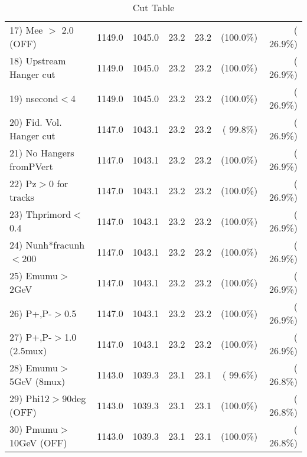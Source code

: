 \begin{table}[h!]
\begin{tabular}{||l||r|r|r|r|r|r||}
 17) Mee $>$ 2.0  (OFF)   &       1149.0 &       1045.0 &         23.2 &         23.2 & (100.0\%) & ( 26.9\%) \\
 18) Upstream Hanger cut  &       1149.0 &       1045.0 &         23.2 &         23.2 & (100.0\%) & ( 26.9\%) \\
 19) nsecond$<$4          &       1149.0 &       1045.0 &         23.2 &         23.2 & (100.0\%) & ( 26.9\%) \\
 20) Fid. Vol. Hanger cut &       1147.0 &       1043.1 &         23.2 &         23.2 & ( 99.8\%) & ( 26.9\%) \\
 21) No Hangers fromPVert &       1147.0 &       1043.1 &         23.2 &         23.2 & (100.0\%) & ( 26.9\%) \\
 22) Pz$>$0 for tracks    &       1147.0 &       1043.1 &         23.2 &         23.2 & (100.0\%) & ( 26.9\%) \\
 23) Thprimord$<$0.4      &       1147.0 &       1043.1 &         23.2 &         23.2 & (100.0\%) & ( 26.9\%) \\
 24) Nunh*fracunh$<$200   &       1147.0 &       1043.1 &         23.2 &         23.2 & (100.0\%) & ( 26.9\%) \\
 25) Emumu$>$2GeV         &       1147.0 &       1043.1 &         23.2 &         23.2 & (100.0\%) & ( 26.9\%) \\
 26) P+,P-$>$0.5          &       1147.0 &       1043.1 &         23.2 &         23.2 & (100.0\%) & ( 26.9\%) \\
 27) P+,P-$>$1.0 (2.5mux) &       1147.0 &       1043.1 &         23.2 &         23.2 & (100.0\%) & ( 26.9\%) \\
 28) Emumu$>$5GeV  (8mux) &       1143.0 &       1039.3 &         23.1 &         23.1 & ( 99.6\%) & ( 26.8\%) \\
 29) Phi12$>$90deg  (OFF) &       1143.0 &       1039.3 &         23.1 &         23.1 & (100.0\%) & ( 26.8\%) \\
 30) Pmumu$>$10GeV  (OFF) &       1143.0 &       1039.3 &         23.1 &         23.1 & (100.0\%) & ( 26.8\%) \\
 \hline
 \hline
 \end{tabular}
 \caption{Cut Table           }
 \label{tab-cutheavy_neutrino_1.000}
 \end{table}
